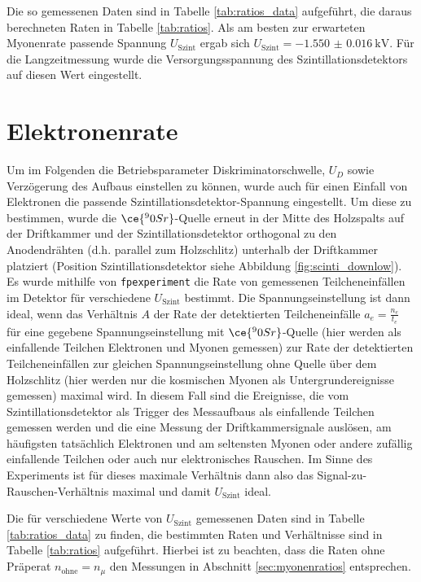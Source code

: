 Die so gemessenen Daten sind in Tabelle \ref{tab:ratios_data} aufgeführt, die daraus berechneten Raten in Tabelle \ref{tab:ratios}. Als am besten zur erwarteten Myonenrate passende Spannung $U_\text{Szint}$ ergab sich $U_\text{Szint}=\SI{-1.550(16)}{\kilo\V}$. Für die Langzeitmessung wurde die Versorgungsspannung des Szintillationsdetektors auf diesen Wert eingestellt.

\section{Elektronenrate}\label{sec:electron_rate}

Um im Folgenden die Betriebsparameter Diskriminatorschwelle, $U_D$ sowie Verzögerung des Aufbaus einstellen zu können, wurde auch für einen Einfall von Elektronen die passende Szintillationsdetektor-Spannung eingestellt. Um diese zu bestimmen, wurde die $\ce{^90Sr}$-Quelle erneut in der Mitte des Holzspalts auf der Driftkammer und der Szintillationsdetektor orthogonal zu den Anodendrähten (d.h. parallel zum Holzschlitz) unterhalb der Driftkammer platziert (Position Szintillationsdetektor siehe Abbildung \ref{fig:scinti_downlow}).
Es wurde mithilfe von \texttt{fpexperiment} die Rate von gemessenen Teilcheneinfällen im Detektor für verschiedene $U_\text{Szint}$ bestimmt. Die Spannungseinstellung ist dann ideal, wenn das Verhältnis $A$ der Rate der detektierten Teilcheneinfälle $a_e=\frac{n_e}{t_e}$ für eine gegebene Spannungseinstellung mit $\ce{^90Sr}$-Quelle (hier werden als einfallende Teilchen Elektronen und Myonen gemessen) zur Rate der detektierten Teilcheneinfällen zur gleichen Spannungseinstellung ohne Quelle über dem Holzschlitz (hier werden nur die kosmischen Myonen als Untergrundereignisse gemessen) maximal wird. In diesem Fall sind die Ereignisse, die vom Szintillationsdetektor als Trigger des Messaufbaus als einfallende Teilchen gemessen werden und die eine Messung der Driftkammersignale auslösen, am häufigsten tatsächlich Elektronen und am seltensten Myonen oder andere zufällig einfallende Teilchen oder auch nur elektronisches Rauschen. Im Sinne des Experiments ist für dieses maximale Verhältnis dann also das Signal-zu-Rauschen-Verhältnis maximal und damit $U_\text{Szint}$ ideal.

Die für verschiedene Werte von $U_\text{Szint}$ gemessenen Daten sind in Tabelle \ref{tab:ratios_data} zu finden, die bestimmten Raten und Verhältnisse sind in Tabelle \ref{tab:ratios} aufgeführt. Hierbei ist zu beachten, dass die Raten ohne Präperat $n_\text{ohne}=n_\mu$ den Messungen in Abschnitt \ref{sec:myonenratios} entsprechen.

